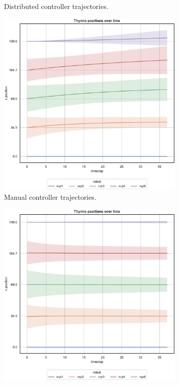 \begin{figure}[!htb]
\begin{center}
\begin{subfigure}[h]{0.49\textwidth}
			\caption{Distributed controller trajectories.}
		\end{subfigure}
	\end{center}
	\begin{center}
	\begin{subfigure}[h]{0.49\textwidth}
		\centering			
		\includegraphics[width=.95\textwidth]{contents/images/net-d6/position-overtime-manual}%
		\caption{Manual controller trajectories.}
	\end{subfigure}
	\hfill
	\begin{subfigure}[h]{0.49\textwidth}
		\centering
		\includegraphics[width=.95\textwidth]{contents/images/net-d6/position-overtime-learned_distributed}

\end{subfigure}
\end{center}
\end{figure}
